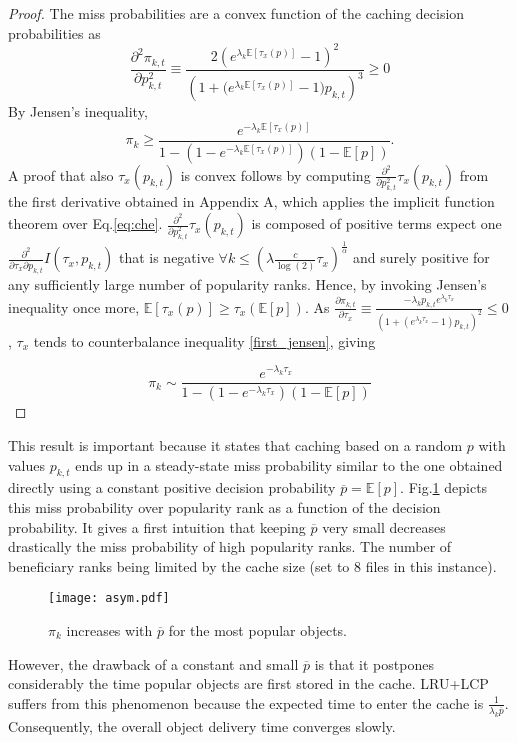 \documentclass[conference]{IEEEtran}
\begin{document}
\begin{proof}
The miss probabilities are a convex function of the caching 
decision probabilities as
$$\frac{\partial^2 \pi_{k,t}}{\partial p^2_{k,t}} \equiv 
\frac{2\left(e^{\lambda_k \mathbb{E}[\tau_x(p)]} - 
1\right)^2}{\left(1 + \big(e^{\lambda_k 
\mathbb{E}[\tau_x(p)]} - 1\big) p_{k,t}\right)^3} \geq 0$$
By Jensen's inequality,
\begin{equation}
\pi_{k} \geq \dfrac{e^{-\lambda_k \mathbb{E}[\tau_x(p)]}}{ 1 - (1 - e^{-\lambda_k \mathbb{E}[\tau_x(p)]})(1 - \mathbb{E}[p])}.
\label{first_jensen}
\end{equation}
A proof that also $\tau_x(p_{k,t})$ is convex  follows by 
computing 
$\frac{\partial^2}{\partial p^2_{k,t}}\tau_x(p_{k,t})$ from the first derivative obtained 
in \cite{DBLP:journals/corr/MartinaGL13} Appendix A, which applies the implicit function 
theorem over  Eq.\eqref{eq:che}. 
$\frac{\partial^2}{\partial p^2_{k,t}}\tau_x(p_{k,t})$ is composed of positive terms expect one 
$\frac{\partial^2}{\partial \tau_x \partial p_{k,t}}I(\tau_x,p_{k,t})$ that is negative $\forall k \leq (\lambda \frac{c}{\log(2)}\tau_x)^{\frac{1}{\alpha}}$ and 
surely positive for any sufficiently large number of 
popularity ranks. Hence, by invoking Jensen's inequality once more,  $\mathbb{E}[\tau_x(p)] \geq \tau_x(\mathbb{E}[p])$.
As $\frac{\partial \pi_{k,t}}{\partial \tau_x} \equiv 
\frac{-\lambda_k p_{k,t}e^{\lambda_k 
\tau_x}}{(1+(e^{\lambda_k \tau_x}-1)p_{k,t})^2} \leq 0$, $ 
\tau_x$ tends to counterbalance inequality 
\eqref{first_jensen}, giving

\begin{equation*}
\pi_k \sim \frac{e^{-\lambda_k \tau_x}}{ 1 - (1 - e^{-\lambda_k \tau_x})(1 - \mathbb{E}[p])}
\end{equation*}
\end{proof}

This result is important because it states that caching based on a random $p$ with values $p_{k,t}$ ends up in a steady-state miss probability similar to the one obtained directly using a constant positive decision probability $\overline{p} = \mathbb{E}[p]$.
Fig.\ref{fig:asym} depicts this miss probability over popularity rank as a function of the decision probability. It gives a first intuition that keeping $\overline{p}$ very small decreases drastically the miss probability of high popularity ranks. The number of beneficiary ranks being limited by the cache size (set to 8 files in this instance).
\begin{figure}[!ht]
\centering
\texttt{[image: asym.pdf]}
\caption{$\pi_k$ increases with $\overline{p}$ for the most popular objects.} 
\label{fig:asym} 
\end{figure}
However, the drawback of a constant and small $\overline{p}$ 
is that it postpones considerably the time popular objects 
are first stored in the cache. LRU+LCP suffers from this 
phenomenon because the expected time to enter the cache is
$\frac{1}{\lambda_k \overline{p}}$. Consequently, the overall 
object delivery time converges slowly.
\end{document}
